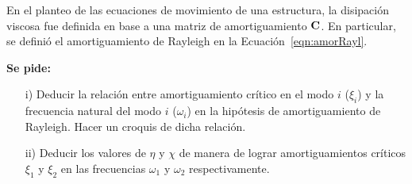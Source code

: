 \begin{exercise}
	
En el planteo de las ecuaciones de movimiento de una estructura, la disipación viscosa fue definida en base a una matriz de amortiguamiento ${\bf C}$. En particular, se definió el amortiguamiento de Rayleigh en la Ecuación~\eqref{eqn:amorRayl}.

\textbf{Se pide:}
\begin{itemize}
		\item[i)] Deducir la relación entre amortiguamiento crítico en el modo $i$ ($\xi_i$) y la frecuencia natural del modo $i$ ($\omega_i$) en la hipótesis de amortiguamiento de Rayleigh. Hacer un croquis de dicha relación.
		\item[ii)] Deducir los valores de $\eta$ y $\chi$ de manera de lograr amortiguamientos críticos $\xi_1$ y $\xi_2$ en las frecuencias $\omega_1$ y $\omega_2$ respectivamente.
	\end{itemize}
	
\end{exercise}


%	
%	
%	
%	


